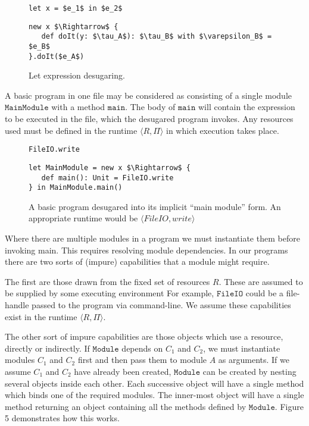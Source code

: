 \documentclass[a4paper,UKenglish]{lipics-v2016}
\newcommand{\kwa}[1]{\mathtt{ #1 }}
\newcommand{\rctx}[0]{ \langle R, \Pi \rangle }
\begin{document}
\begin{figure}[h]
\begin{lstlisting}[mathescape]
let x = $e_1$ in $e_2$
\end{lstlisting}

\begin{lstlisting}[mathescape]
new x $\Rightarrow$ {
   def doIt(y: $\tau_A$): $\tau_B$ with $\varepsilon_B$ = $e_B$
}.doIt($e_A$)
\end{lstlisting}

\vspace{-7pt}
\caption{Let expression desugaring.}
\label{f-resource-modules}
\end{figure}

\noindent
A basic program in one file may be considered as consisting of a single module $\kwa{MainModule}$ with a method $\kwa{main}$. The body of $\kwa{main}$ will contain the expression to be executed in the file, which the desugared program invokes. Any resources used must be defined in the runtime $\rctx$ in which execution takes place.

\begin{figure}[h]

\begin{lstlisting}
FileIO.write
\end{lstlisting}

\begin{lstlisting}[mathescape]
let MainModule = new x $\Rightarrow$ {
   def main(): Unit = FileIO.write
} in MainModule.main()
\end{lstlisting}
\vspace{-7pt}
\caption{A basic program desugared into its implicit ``main module'' form. An appropriate runtime would be $\langle FileIO, write \rangle$}
\end{figure}

\noindent
Where there are multiple modules in a program we must instantiate them before invoking main. This requires resolving module dependencies. In our programs there are two sorts of (impure) capabilities that a module might require.

The first are those drawn from the fixed set of resources $R$. These are assumed to be supplied by some executing environment For example, $\kwa{FileIO}$ could be a file-handle passed to the program via command-line. We assume these capabilities exist in the runtime $\rctx$.

The other sort of impure capabilities are those objects which use a resource, directly or indirectly. If $\kwa{Module}$ depends on $C_1$ and $C_2$, we must instantiate modules $C_1$ and $C_2$ first and then pass them to module $A$ as arguments. If we assume $C_1$ and $C_2$ have already been created, $\kwa{Module}$ can be created by nesting several objects inside each other. Each successive object will have a single method which binds one of the required modules. The inner-most object will have a single method returning an object containing all the methods defined by $\kwa{Module}$. Figure 5 demonstrates how this works. \\
\end{document}
